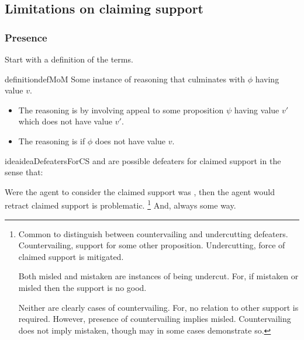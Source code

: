 \subsection{Limitations on claiming support}
\label{sec:claimed-support-1}

\subsubsection{Presence}
\label{sec:presence}

\begin{note}
  \color{red}
  Start with a definition of the terms.
\end{note}

\begin{note}
  \begin{restatable}{definition}{defMoM}\label{def:MoM}
    Some instance of reasoning that culminates with \(\phi\) having value \(v\).
    \begin{itemize}
      \item The reasoning is \emph{\mistaken{}} by involving appeal to some proposition \(\psi\) having value \(v'\) which does not have value \(v'\).
    \item The reasoning is \emph{\misled{}} if \(\phi\) does not have value \(v\).
    \end{itemize}
    \vspace{-\baselineskip}
  \end{restatable}
\end{note}

\begin{note}
  \begin{restatable}[\twodefeaters{-} --- \twodefeaters{}]{idea}{ideaDefeatersForCS}\label{idea:defs-for-CS}
    \mistaken{-} and \misled{} are possible defeaters for claimed support in the sense that:

    Were the agent to consider the claimed support was \mom{}, then the agent would retract claimed support is problematic.\nolinebreak
    \footnote{
      Common to distinguish between countervailing and undercutting defeaters.
      Countervailing, support for some other proposition.
      Undercutting, force of claimed support is mitigated.

      Both misled and mistaken are instances of being undercut.
      For, if mistaken or misled then the support is no good.

      Neither are clearly cases of countervailing.
      For, no relation to other support is required.
      However, presence of countervailing implies misled.
      Countervailing does not imply mistaken, though may in some cases demonstrate so.
    }
    And, always some way.
  \end{restatable}
\end{note}

